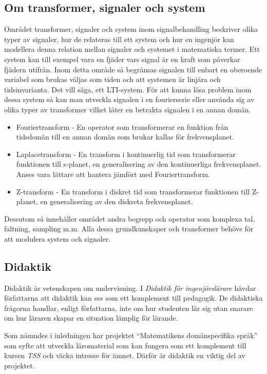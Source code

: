 \documentclass[]{article}
\begin{document}
\subsection{Om transformer, signaler och system}
Området transformer, signaler och system inom signalbehandling beskriver olika typer av signaler,
hur de relateras till ett system och hur en ingenjör kan modellera denna relation mellan signaler och systemet 
i matematiska termer. Ett system kan till exempel vara en fjäder vars signal är en kraft som påverkar fjädern utifrån. 
Inom detta område så begränsas signalen till enbart en oberoende variabel som brukas väljas 
som tiden och att systemen är linjära och tidsinvarianta. Det vill säga, ett LTI-system.
För att kunna lösa problem inom dessa system så kan man utveckla signalen i en fourierserie eller använda 
sig av olika typer av transformer vilket låter en betrakta signalen i en annan domän. 
\begin{itemize}
\item Fouriertransform - En operator som transformerar en funktion från tidsdomän till en annan domän som brukar kallas för frekvensplanet. 
\item Laplacetransform - En transform i kontinuerlig tid som transformerar funktionen till s-planet, en generalisering av den kontinuerliga frekvensplanet. Anses vara lättare att hantera jämfört med Fouriertransform.  
\item Z-transform - En transform i diskret tid som transformerar funktionen till Z-planet, en generalisering av den diskreta frekvensplanet.
\end{itemize}
Dessutom så innehåller området andra begrepp och operator som komplexa tal, faltning, sampling m.m. 
Alla dessa grundkunskaper och transformer behövs för att modulera system och signaler.


\subsection{Didaktik}
Didaktik är vetenskapen om undervisning.
I \textit{Didaktik för ingenjörslärare} hävdar författarna att
didaktik kan ses som ett komplement till pedagogik.
De didaktiska frågorna handlar, enligt författarna,
inte om hur studenten lär sig utan snarare om hur läraren skapar en
situation lämplig för lärande.

Som nämndes i inledningen har projektet “Matematikens domänspecifika språk”
som syfte att utveckla läromaterial som kan fungera som ett komplement till
kursen \textit{TSS} och väcka intresse för ämnet.
Därför är didaktik en viktig del av projektet.
\end{document}
